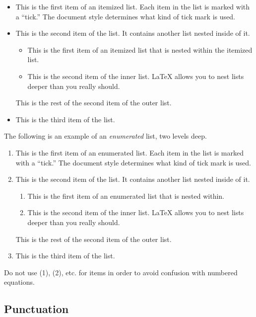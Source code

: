 \documentclass[qe,nameyear,final,openaccess]{econsocart}
\theoremstyle{plain}
\begin{document}
\begin{itemize}
\item This is the first item of an itemized list. Each item in the list is marked with a ``tick.'' The document style determines what kind of tick mark is used.
\item This is the second item of the list. It contains another list nested inside of it.

\begin{itemize}
\item This is the first item of an itemized list that is nested within the itemized list.
\item This is the second item of the inner list. LaTeX allows you to nest lists deeper than you really should.
\end{itemize}

This is the rest of the second item of the outer list.


\item This is the third item of the list.
\end{itemize}

The following is an example of an \textit{enumerated} list, two levels deep.

\begin{enumerate}
\item This is the first item of an enumerated list. Each item in the list is marked with a ``tick.'' The document style determines what kind of tick mark is used.
\item This is the second item of the list. It contains another list nested inside of it.

\begin{enumerate}
\item This is the first item of an enumerated list that is nested within.
\item This is the second item of the inner list. LaTeX allows you to nest lists deeper than you really should.
\end{enumerate}

This is the rest of the second item of the outer list.


\item This is the third item of the list.
\end{enumerate}

Do not use (1), (2), etc.  for items in order to avoid confusion with numbered equations.

\subsection{Punctuation}
\end{document}
